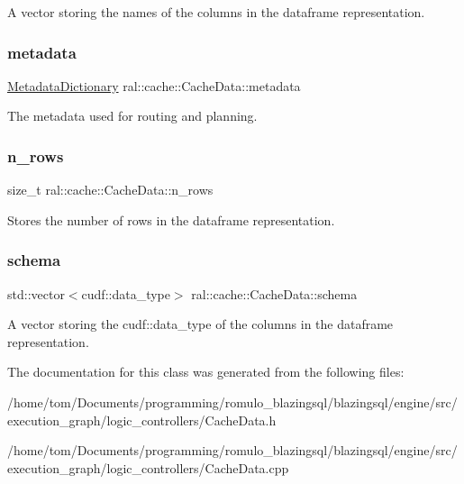 A vector storing the names of the columns in the dataframe representation. \mbox{\label{classral_1_1cache_1_1CacheData_aaeb232ef3aa8c2a3d86e1169ed2e8152}} 
\subsubsection{\texorpdfstring{metadata}{metadata}}
{\footnotesize\ttfamily \hyperlink{classral_1_1cache_1_1MetadataDictionary}{Metadata\+Dictionary} ral\+::cache\+::\+Cache\+Data\+::metadata\hspace{0.3cm}{\ttfamily [protected]}}

The metadata used for routing and planning. \mbox{\label{classral_1_1cache_1_1CacheData_a4cdddfb8e552e0e3e91877ae80e5fc9e}} 
\subsubsection{\texorpdfstring{n\+\_\+rows}{n\_rows}}
{\footnotesize\ttfamily size\+\_\+t ral\+::cache\+::\+Cache\+Data\+::n\+\_\+rows\hspace{0.3cm}{\ttfamily [protected]}}

Stores the number of rows in the dataframe representation. \mbox{\label{classral_1_1cache_1_1CacheData_aec9a1b3c0fb78cfdb3bd5494bcee2d8f}} 
\subsubsection{\texorpdfstring{schema}{schema}}
{\footnotesize\ttfamily std\+::vector$<$cudf\+::data\+\_\+type$>$ ral\+::cache\+::\+Cache\+Data\+::schema\hspace{0.3cm}{\ttfamily [protected]}}

A vector storing the cudf\+::data\+\_\+type of the columns in the dataframe representation. 

The documentation for this class was generated from the following files\+:\begin{DoxyCompactItemize}
\item 
/home/tom/\+Documents/programming/romulo\+\_\+blazingsql/blazingsql/engine/src/execution\+\_\+graph/logic\+\_\+controllers/Cache\+Data.\+h\item 
/home/tom/\+Documents/programming/romulo\+\_\+blazingsql/blazingsql/engine/src/execution\+\_\+graph/logic\+\_\+controllers/Cache\+Data.\+cpp\end{DoxyCompactItemize}

